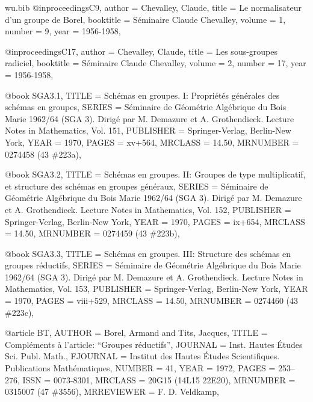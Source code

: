 \documentclass{amsart}
\numberwithin{equation}{section}
\theoremstyle{plain}
\theoremstyle{definition}
\begin{document}
\begin{filecontents}{wu.bib}
@inproceedings{C9, 
	author		= {Chevalley, Claude},
	title		= {Le normalisateur d'un groupe de Borel},
	booktitle	= {S\'eminaire Claude Chevalley},
	volume		= {1},
	number		= {9},
	year		= {1956-1958},
}

@inproceedings{C17, 
	author		= {Chevalley, Claude},
	title		= {Les sous-groupes radiciel},
	booktitle	= {S\'eminaire Claude Chevalley},
	volume		= {2},
	number		= {17},
	year		= {1956-1958},
}

@book {SGA3.1, 
     TITLE = {Sch\'emas en groupes. {I}: {P}ropri\'et\'es g\'en\'erales des
              sch\'emas en groupes},
    SERIES = {S\'eminaire de G\'eom\'etrie Alg\'ebrique du Bois Marie
              1962/64 (SGA 3). Dirig\'e par M. Demazure et A. Grothendieck.
              Lecture Notes in Mathematics, Vol. 151},
 PUBLISHER = {Springer-Verlag, Berlin-New York},
      YEAR = {1970},
     PAGES = {xv+564},
   MRCLASS = {14.50},
  MRNUMBER = {0274458 (43 \#223a)},
}

@book {SGA3.2, 
     TITLE = {Sch\'emas en groupes. {II}: {G}roupes de type multiplicatif,
              et structure des sch\'emas en groupes g\'en\'eraux},
    SERIES = {S\'eminaire de G\'eom\'etrie Alg\'ebrique du Bois Marie
              1962/64 (SGA 3). Dirig\'e par M. Demazure et A. Grothendieck.
              Lecture Notes in Mathematics, Vol. 152},
 PUBLISHER = {Springer-Verlag, Berlin-New York},
      YEAR = {1970},
     PAGES = {ix+654},
   MRCLASS = {14.50},
  MRNUMBER = {0274459 (43 \#223b)},
}

@book {SGA3.3, 
     TITLE = {Sch\'emas en groupes. {III}: {S}tructure des sch\'emas en
              groupes r\'eductifs},
    SERIES = {S\'eminaire de G\'eom\'etrie Alg\'ebrique du Bois Marie
              1962/64 (SGA 3). Dirig\'e par M. Demazure et A. Grothendieck.
              Lecture Notes in Mathematics, Vol. 153},
 PUBLISHER = {Springer-Verlag, Berlin-New York},
      YEAR = {1970},
     PAGES = {viii+529},
   MRCLASS = {14.50},
  MRNUMBER = {0274460 (43 \#223c)},
}

@article {BT, 
    AUTHOR = {Borel, Armand and Tits, Jacques},
     TITLE = {Compl\'ements \`a l'article: ``{G}roupes r\'eductifs''},
   JOURNAL = {Inst. Hautes \'Etudes Sci. Publ. Math.},
  FJOURNAL = {Institut des Hautes \'Etudes Scientifiques. Publications
              Math\'ematiques},
    NUMBER = {41},
      YEAR = {1972},
     PAGES = {253--276},
      ISSN = {0073-8301},
   MRCLASS = {20G15 (14L15 22E20)},
  MRNUMBER = {0315007 (47 \#3556)},
MRREVIEWER = {F. D. Veldkamp},
}


\end{filecontents}
\end{document}
